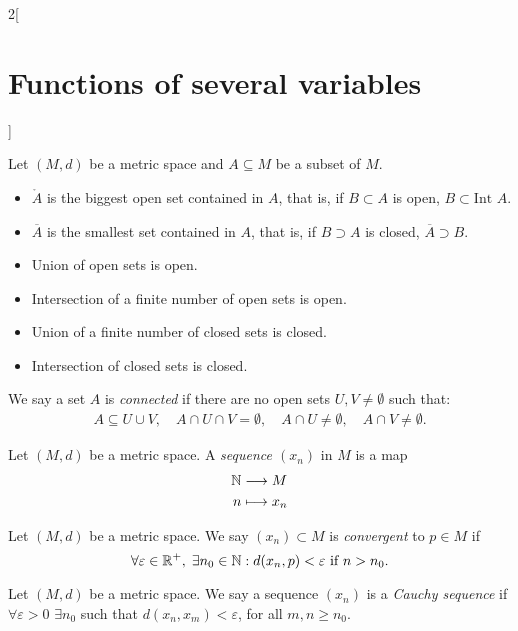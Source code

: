 \documentclass[../../../main.tex]{subfiles}
\begin{document}
\begin{multicols}{2}[\section{Functions of several variables}]
\begin{prop}
\end{prop}
\begin{prop}
Let $(M,d)$ be a metric space and $A\subseteq M$ be a subset of $M$.
\begin{itemize}
    \item $\mathring A$ is the biggest open set contained in $A$, that is, if $B\subset A$ is open, $B\subset\text{Int }A$.
    \item $\overline{A}$ is the smallest set contained in $A$, that is, if $B\supset A$ is closed, $\overline{A}\supset B$.
\end{itemize}
\end{prop}
\begin{prop}
\hfill
\begin{itemize}
    \item Union of open sets is open.
    \item Intersection of a finite number of open sets is open.
    \item Union of a finite number of closed sets is closed.
    \item Intersection of closed sets is closed.
\end{itemize}
\end{prop}
\begin{definition}
We say a set $A$ is \textit{connected} if there are no open sets $U,V\ne\emptyset$ such that: 
\begin{gather*}
    A\subseteq U\cup V,\quad A\cap U\cap V=\emptyset,\quad A\cap U\ne\emptyset,\quad A\cap V\ne\emptyset.
\end{gather*}
\end{definition}
\begin{definition}
Let $(M,d)$ be a metric space. A \textit{sequence $(x_n)$} in $M$ is a map
\begin{align*}
    \mathbb{N} &\longrightarrow M\\
    n&\longmapsto x_n
\end{align*}
\end{definition}
\begin{definition}
Let $(M,d)$ be a metric space. We say $(x_n)\subset M$ is \textit{convergent} to $p\in M$ if $$\forall\varepsilon\in\mathbb{R}^+,\;\exists n_0\in\mathbb{N} :d(x_n,p)<\varepsilon\text{ if }n>n_0.$$
\end{definition}
\begin{definition}
Let $(M,d)$ be a metric space. We say a sequence $(x_n)$ is a \textit{Cauchy sequence} if $\forall\varepsilon>0$ $\exists n_0$ such that $d(x_n,x_m)<\varepsilon$, for all $m,n\geq n_0$.

\end{definition}
\end{multicols}
\end{document}
